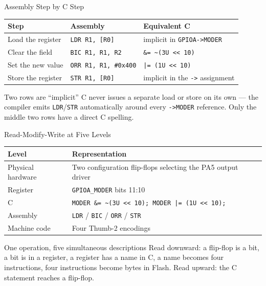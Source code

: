 \documentclass[9pt,aspectratio=169,xcolor=table]{beamer}
\begin{document}
\begin{frame}{Assembly Step by C Step}
    \begin{center}
    {\small
    \striped
    \begin{tabular}{@{}l l l@{}}
        \toprule
        \textbf{Step} & \textbf{Assembly} & \textbf{Equivalent C} \\
        \midrule
        Load the register & \texttt{LDR R1, [R0]} & implicit in \texttt{GPIOA->MODER} \\
        Clear the field & \texttt{BIC R1, R1, R2} & \texttt{\&= \textasciitilde(3U <{<} 10)} \\
        Set the new value & \texttt{ORR R1, R1, \#0x400} & \texttt{|= (1U <{<} 10)} \\
        Store the register & \texttt{STR R1, [R0]} & implicit in the \texttt{->} assignment \\
        \bottomrule
    \end{tabular}}
    \end{center}

    \vspace{3mm}
    \begin{block}{Two rows are ``implicit''}
        C never issues a separate load or store on its own --- the compiler
        emits \texttt{LDR}/\texttt{STR} automatically around every
        \texttt{->MODER} reference. Only the middle two rows have a direct
        C spelling.
    \end{block}
\end{frame}

\begin{frame}{Read-Modify-Write at Five Levels}
    \begin{center}
    {\small
    \striped
    \begin{tabular}{@{}l R{.65\textwidth}@{}}
        \toprule
        \textbf{Level} & \textbf{Representation} \\
        \midrule
        Physical hardware & Two configuration flip-flops selecting the PA5 output driver \\
        Register          & \texttt{GPIOA\_MODER} bits 11:10 \\
        C                 & \texttt{MODER \&= \textasciitilde(3U {<}< 10); MODER |= (1U {<}< 10);} \\
        Assembly          & \texttt{LDR} / \texttt{BIC} / \texttt{ORR} / \texttt{STR} \\
        Machine code      & Four Thumb-2 encodings \\
        \bottomrule
    \end{tabular}}
    \end{center}

    \vspace{3mm}
    \begin{block}{One operation, five simultaneous descriptions}
        Read downward: a flip-flop is a bit, a bit is in a register, a
        register has a name in C, a name becomes four instructions, four
        instructions become bytes in Flash. Read upward: the C statement
        reaches a flip-flop.
    \end{block}
\end{frame}
\end{document}
